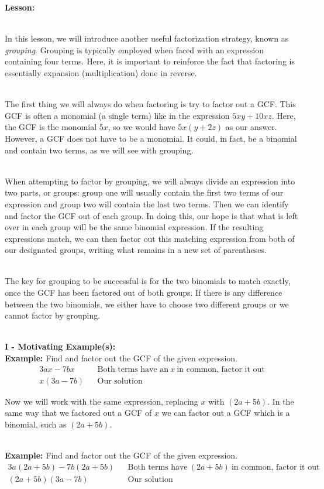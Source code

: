 \documentclass[12pt]{article}
\theoremstyle{definition}
\begin{document}
{\bf Lesson:}\\
\ \par
In this lesson, we will introduce another useful factorization strategy, known as {\it grouping}.  Grouping is typically employed when faced with an expression containing four terms.  Here, it is important to reinforce the fact that factoring is essentially expansion (multiplication) done in reverse.\\
\ \par
The first thing we will always do when factoring is try to factor out a GCF. This GCF is often a monomial (a single term) like in the expression $5 x y + 10 x z$.  Here, the GCF is the monomial $5 x$, so we would have $5 x (y + 2 z)$ as our answer. However, a GCF does not have to be a monomial.  It could, in fact, be a binomial and contain two terms, as we will see with grouping.\\
\ \par
When attempting to factor by grouping, we will always divide an expression into two parts, or groups: group one will usually contain the first two terms of our expression and group two will contain the last two terms. Then we can identify and factor the GCF out of each group.  In doing this, our hope is that what is left over in each group will be the same binomial expression. If the resulting expressions match, we can then factor out this matching expression from both of our designated groups, writing what remains in a new set of parentheses.\\
\ \par
The key for grouping to be successful is for the two binomials to match exactly, once the GCF has been factored out of both groups. If there is any difference between the two binomials, we either have to choose two different groups or we cannot factor by grouping.\\
\ \par

{\bf I - Motivating Example(s):}\\

{\bf Example:} Find and factor out the GCF of the given expression.
  \begin{eqnarray*}
    3 a x - 7 b x &  & \text{Both terms have an} \ x \ \text{in common, factor it out}\\
    x (3 a - 7 b) &  & \text{Our solution}
  \end{eqnarray*}

Now we will work with the same expression, replacing $x$ with $(2 a + 5 b)$.  In the same way that we factored out a GCF of $x$ we can factor out a GCF which is a binomial, such as $(2 a + 5 b)$.\\
\ \par
{\bf Example:} Find and factor out the GCF of the given expression.
  \begin{eqnarray*}
    3 a (2 a + 5 b) - 7 b (2 a + 5 b) &  & \text{Both terms have} \ (2 a + 5 b) \
    \text{in common, factor it out}\\
    (2 a + 5 b) (3 a - 7 b) &  & \text{Our solution}
  \end{eqnarray*}
\end{document}
